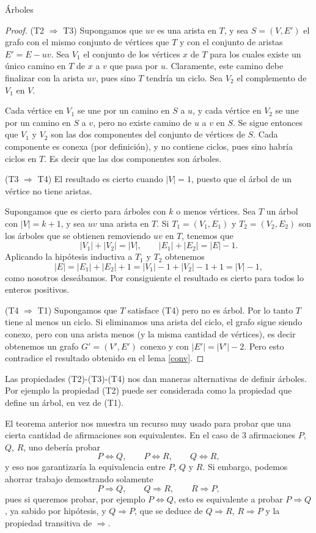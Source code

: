 \begin{section}{Árboles}
\begin{proof}

\noindent (T2 $\Rightarrow$ T3) Supongamos que $uv$ es una arista en $T$, y sea $S=(V,E')$ el
grafo con el mismo conjunto de vértices que $T$ y con el conjunto
de aristas $E'=E-uv$. Sea $V_1$ el conjunto de los vértices $x$ de
$T$ para los cuales existe un único camino en $T$ de $x$ a $v$ que
pasa por $u$. Claramente, este camino debe finalizar con la arista
$uv$, pues sino $T$ tendría un ciclo. Sea $V_2$ el complemento de
$V_1$ en $V$.

Cada vértice en $V_1$ se une por un camino en $S$ a $u$, y cada
vértice en $V_2$ se une por un camino en $S$ a $v$, pero no existe
camino de $u$ a $v$ en $S$. Se sigue entonces que $V_1$ y $V_2$
son las dos componentes del conjunto de vértices de $S$. Cada
componente es conexa (por definición), y no contiene ciclos, pues
sino habría ciclos en $T$. Es decir que las dos componentes son
árboles.


\noindent(T3 $\Rightarrow$ T4) El resultado es cierto cuando $|V|=1$, puesto que el árbol de
un vértice no tiene aristas.

Supongamos que es cierto para árboles con $k$ o menos vértices.
Sea $T$ un árbol con $|V|=k+1$, y sea $uv$ una arista en $T$. Si
$T_1=(V_1,E_1)$ y $T_2=(V_2,E_2)$ son los árboles que se obtienen
removiendo $uv$ en $T$, tenemos que
$$
|V_1| + |V_2| = |V|, \qquad |E_1| + |E_2| = |E|-1.
$$
Aplicando la hipótesis inductiva a $T_1$ y $T_2$ obtenemos
$$
|E|=|E_1| + |E_2| + 1 = |V_1|-1 +|V_2|-1+1= |V| -1,
$$
como nosotros deseábamos. Por consiguiente el resultado es cierto
para todos lo enteros positivos.


\noindent (T4 $\Rightarrow$ T1) Supongamos que $T$ satisface (T4) pero no es árbol. Por lo tanto $T$ tiene al menos un ciclo. Si eliminamos una arista del ciclo, el grafo sigue siendo conexo, pero con una arista menos (y la misma cantidad de vértices), es decir obtenemos un grafo $G' = (V',E')$  conexo y con $|E'| = |V'|-2$. Pero esto contradice el resultado obtenido en el lema \ref{conv}.    
\end{proof}

Las propiedades (T2)-(T3)-(T4) nos dan maneras alternativas de definir
árboles. Por ejemplo la propiedad (T2) puede ser considerada como
la propiedad que define un árbol, en vez de (T1). 

\begin{observacion}
El teorema anterior nos muestra un recurso muy usado para probar que una cierta cantidad de afirmaciones son equivalentes. En el caso de $3$ afirmaciones $P$, $Q$, $R$, uno debería probar
$$
P \Leftrightarrow Q,\qquad P \Leftrightarrow R,\qquad Q \Leftrightarrow R,
$$
y eso nos garantizaría la equivalencia entre $P$, $Q$ y $R$. Si embargo, podemos ahorrar trabajo demostrando solamente
$$
P \Rightarrow Q,\qquad Q \Rightarrow R,\qquad R \Rightarrow P,
$$  
pues si queremos probar, por ejemplo $P \Leftrightarrow Q$, esto es equivalente a probar $P \Rightarrow Q$, ya sabido por hipótesis, y $Q \Rightarrow P$, que se deduce de $Q \Rightarrow R$, $R \Rightarrow P$ y la propiedad transitiva de $\Rightarrow$. 


\end{observacion}
\end{section}
